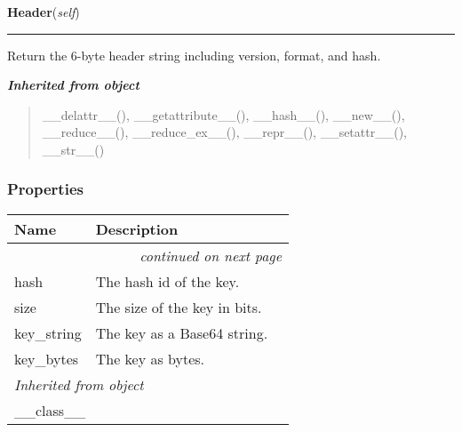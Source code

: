     \vspace{0.5ex}

\hspace{.8\funcindent}\begin{boxedminipage}{\funcwidth}

    \raggedright \textbf{Header}(\textit{self})

    \vspace{-1.5ex}

    \rule{\textwidth}{0.5\fboxrule}
\setlength{\parskip}{2ex}
    Return the 6-byte header string including version, format, and hash.

\setlength{\parskip}{1ex}
    \end{boxedminipage}


\large{\textbf{\textit{Inherited from object}}}

\begin{quote}
\_\_delattr\_\_(), \_\_getattribute\_\_(), \_\_hash\_\_(), \_\_new\_\_(), \_\_reduce\_\_(), \_\_reduce\_ex\_\_(), \_\_repr\_\_(), \_\_setattr\_\_(), \_\_str\_\_()
\end{quote}


  \subsubsection{Properties}

    \vspace{-1cm}
\hspace{\varindent}\begin{longtable}{|p{\varnamewidth}|p{\vardescrwidth}|l}
\cline{1-2}
\cline{1-2} \centering \textbf{Name} & \centering \textbf{Description}& \\
\cline{1-2}
\endhead\cline{1-2}\multicolumn{3}{r}{\small\textit{continued on next page}}\\\endfoot\cline{1-2}
\endlastfoot\raggedright h\-a\-s\-h\- & \raggedright The hash id of the key.&\\
\cline{1-2}
\raggedright s\-i\-z\-e\- & \raggedright The size of the key in bits.&\\
\cline{1-2}
\raggedright k\-e\-y\-\_\-s\-t\-r\-i\-n\-g\- & \raggedright The key as a Base64 string.&\\
\cline{1-2}
\raggedright k\-e\-y\-\_\-b\-y\-t\-e\-s\- & \raggedright The key as bytes.&\\
\cline{1-2}
\multicolumn{2}{|l|}{\textit{Inherited from object}}\\
\multicolumn{2}{|p{\varwidth}|}{\raggedright \_\_class\_\_}\\
\cline{1-2}
\end{longtable}


